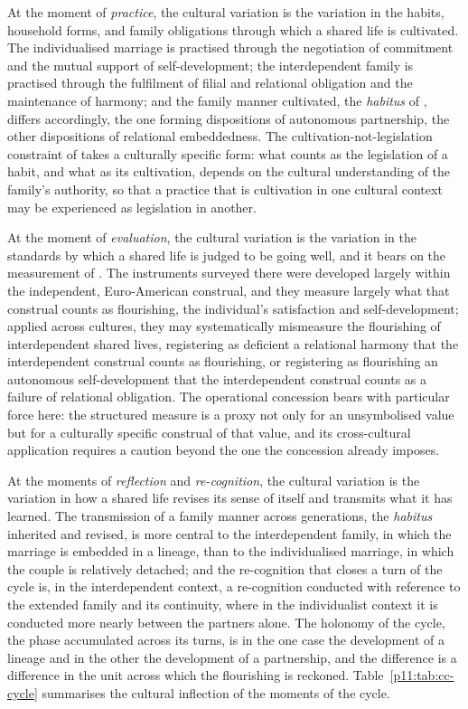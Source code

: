 At the moment of \emph{practice}, the cultural variation is the variation in the habits, household forms, and family obligations through which a shared life is cultivated. The individualised marriage is practised through the negotiation of commitment and the mutual support of self-development; the interdependent family is practised through the fulfilment of filial and relational obligation and the maintenance of harmony; and the family manner cultivated, the \emph{habitus} of , differs accordingly, the one forming dispositions of autonomous partnership, the other dispositions of relational embeddedness. The cultivation-not-legislation constraint of  takes a culturally specific form: what counts as the legislation of a habit, and what as its cultivation, depends on the cultural understanding of the family's authority, so that a practice that is cultivation in one cultural context may be experienced as legislation in another.

At the moment of \emph{evaluation}, the cultural variation is the variation in the standards by which a shared life is judged to be going well, and it bears on the measurement of . The instruments surveyed there were developed largely within the independent, Euro-American construal, and they measure largely what that construal counts as flourishing, the individual's satisfaction and self-development; applied across cultures, they may systematically mismeasure the flourishing of interdependent shared lives, registering as deficient a relational harmony that the interdependent construal counts as flourishing, or registering as flourishing an autonomous self-development that the interdependent construal counts as a failure of relational obligation. The operational concession bears with particular force here: the structured measure is a proxy not only for an unsymbolised value but for a culturally specific construal of that value, and its cross-cultural application requires a caution beyond the one the concession already imposes.

At the moments of \emph{reflection} and \emph{re-cognition}, the cultural variation is the variation in how a shared life revises its sense of itself and transmits what it has learned. The transmission of a family manner across generations, the \emph{habitus} inherited and revised, is more central to the interdependent family, in which the marriage is embedded in a lineage, than to the individualised marriage, in which the couple is relatively detached; and the re-cognition that closes a turn of the cycle is, in the interdependent context, a re-cognition conducted with reference to the extended family and its continuity, where in the individualist context it is conducted more nearly between the partners alone. The holonomy of the cycle, the phase accumulated across its turns, is in the one case the development of a lineage and in the other the development of a partnership, and the difference is a difference in the unit across which the flourishing is reckoned. Table~\ref{p11:tab:cc-cycle} summarises the cultural inflection of the moments of the cycle.

